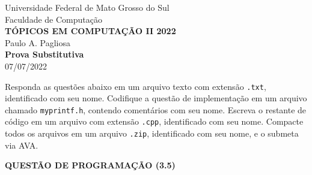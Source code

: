 \documentclass[12pt]{article}
\newcommand{\hfile}[1]{{\color{myorange}\texttt{#1.h}}}
\begin{document}
\pagestyle{empty}

\begin{center}
  Universidade Federal de Mato Grosso do Sul \\
  Faculdade de Computação \\[1em]
  {\bf\large TÓPICOS EM COMPUTAÇÃO II 2022} \\
  Paulo A. Pagliosa \\[1em]
  {\bf Prova Substitutiva} \\
  07/07/2022
\end{center}

\vspace{5mm}
\noindent
Responda as questões abaixo em um arquivo texto com extensão \texttt{.txt}, identificado com seu nome. Codifique a questão de implementação em um arquivo chamado \hfile{myprintf}, contendo comentários com seu nome. Escreva o restante de código em um arquivo com extensão \texttt{.cpp}, identificado com seu nome. Compacte todos os arquivos em um arquivo \texttt{.zip}, identificado com seu nome, e o submeta via AVA.

\vspace{5mm}
\noindent
{\bf QUESTÃO DE PROGRAMAÇÃO (3.5)}
\end{document}
